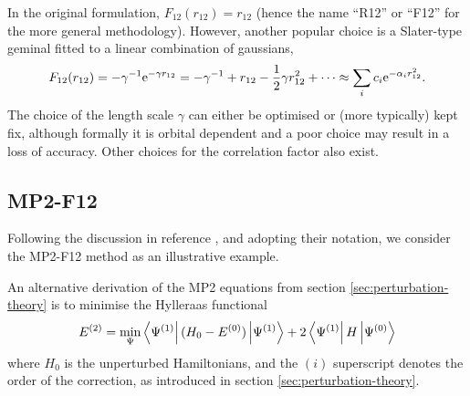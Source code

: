 In the original formulation, $F_{12}(r_{12})=r_{12}$ (hence the name ``R12'' or ``F12'' for the more general methodology). However, another popular choice is a Slater-type geminal\supercite{ten-noInitiation2004} fitted to a linear combination of gaussians,\supercite{wernerGeneral2007}
\begin{equation}
    \label{eq:f12-exponential}
    F_{12}(r_{12})=-\gamma^{-1}\mathrm{e}^{-\gamma r_{12}} = -\gamma^{-1}+r_{12}-\frac 12\gamma r_{12}^2+\cdots \approx \sum_i c_i\mathrm{e}^{-\alpha_ir_{12}^2}.
\end{equation}
The choice of the length scale $\gamma$ can either be optimised or (more typically) kept fix, although formally it is orbital dependent and a poor choice may result in a loss of accuracy.\supercite{tewRelaxing2018} Other choices for the correlation factor also exist.\supercite{johnsonExplicit2017}

\subsection{MP2-F12}

Following the discussion in reference , and adopting their notation, we consider the MP2-F12 method as an illustrative example.

An alternative derivation of the \gls{MP2} equations from section \ref{sec:perturbation-theory} is to minimise the Hylleraas functional\supercite{hylleraasUeber1930,betheQuantum1957}
\begin{equation}
    \label{eq:hyllerass-functional}
    E^{(2)} = \min_\Psi\bra{\Psi^{(1)}}(H_0-E^{(0)})\ket{\Psi^{(1)}}+2\bra{\Psi^{(1)}}H\ket{\Psi^{(0)}}
\end{equation}
where $H_0$ is the unperturbed Hamiltonians, and the $(i)$ superscript denotes the order of the correction, as introduced in section \ref{sec:perturbation-theory}.

